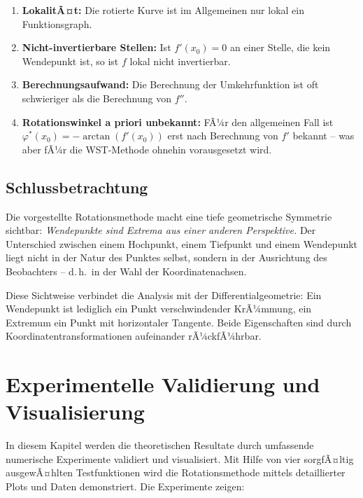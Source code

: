﻿\documentclass[12pt, a4paper]{article}
\theoremstyle{definition}
\begin{document}
	\begin{enumerate}[label=\arabic*.]
		\item \textbf{LokalitÃ¤t:} Die rotierte Kurve ist im Allgemeinen nur lokal
		ein Funktionsgraph.
		
		\item \textbf{Nicht-invertierbare Stellen:} Ist $f'(x_0) = 0$ an einer
		Stelle, die kein Wendepunkt ist, so ist $f$ lokal nicht invertierbar.
		
		\item \textbf{Berechnungsaufwand:} Die Berechnung der Umkehrfunktion ist
		oft schwieriger als die Berechnung von $f''$.
		
		\item \textbf{Rotationswinkel a priori unbekannt:} FÃ¼r den allgemeinen Fall
		ist $\varphi^*(x_0) = -\arctan(f'(x_0))$ erst nach Berechnung von $f'$
		bekannt -- was aber fÃ¼r die WST-Methode ohnehin vorausgesetzt wird.
	\end{enumerate}
	
	\subsection{Schlussbetrachtung}
	
	Die vorgestellte Rotationsmethode macht eine tiefe geometrische Symmetrie
	sichtbar: \emph{Wendepunkte sind Extrema aus einer anderen Perspektive.}
	Der Unterschied zwischen einem Hochpunkt, einem Tiefpunkt und einem
	Wendepunkt liegt nicht in der Natur des Punktes selbst, sondern in der
	Ausrichtung des Beobachters -- d.\,h.\ in der Wahl der Koordinatenachsen.
	
	Diese Sichtweise verbindet die Analysis mit der Differentialgeometrie: Ein
	Wendepunkt ist lediglich ein Punkt verschwindender KrÃ¼mmung, ein Extremum
	ein Punkt mit horizontaler Tangente. Beide Eigenschaften sind durch
	Koordinatentransformationen aufeinander rÃ¼ckfÃ¼hrbar.
	
	\section{Experimentelle Validierung und Visualisierung}
	\label{sec:experiments}
	
	In diesem Kapitel werden die theoretischen Resultate durch umfassende
	numerische Experimente validiert und visualisiert. Mit Hilfe von vier
	sorgfÃ¤ltig ausgewÃ¤hlten Testfunktionen wird die Rotationsmethode mittels
	detaillierter Plots und Daten demonstriert. Die Experimente zeigen:
	
\end{document}
